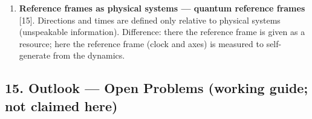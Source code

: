 \documentclass[
  a4paper,
]{article}
\begin{document}
\begin{enumerate}
  into collective rhythms is classical since Huygens. Difference: this
  paper reads entrainment as the \textbf{mechanism by which proper time
  subsists} --- the clock is an order collectively enforced by the
  condensate --- leading to the kinematic classification ``rest is the
  fate of massless perturbations; motion is the privilege of mass.''
\item
  \textbf{Reference frames as physical systems --- quantum reference
  frames} {[}15{]}. Directions and times are defined only relative to
  physical systems (unspeakable information). Difference: there the
  reference frame is given as a resource; here the reference frame
  (clock and axes) is measured to self-generate from the dynamics.
\end{enumerate}

\subsection{15. Outlook --- Open Problems (working guide; not claimed
here)}\label{outlook-open-problems-working-guide-not-claimed-here}
\end{document}
